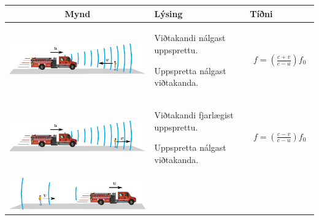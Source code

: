 \ifdefined \wholebook \else\documentclass[oneside]{book}\usepackage{EdlBook}\graphicspath{{figures/}}
\begin{document}
\begin{table}[h!]
  \centering
  \begin{tabular}{ | c | m{5.2cm} | m{2.5cm} | }
    \hline
    \textbf{Mynd} & \hspace{1.9cm} \textbf{Lýsing} & \hspace{0.4cm} \textbf{Tíðni} \\ \hline
    \begin{minipage}{.4\textwidth}
    \vspace{0.3cm}
    \centering
      \includegraphics[width=0.95\linewidth]{figures/doppler-tilvik1.pdf}
    \vspace{0.3cm}
    \end{minipage}
    &
      Viðtakandi nálgast uppsprettu. \par Uppspretta nálgast viðtakanda.
    & 
      \begin{align*}
          f = \left( \frac{c + v}{c - u} \right)f_0
      \end{align*}
    \\ \hline
    \begin{minipage}{.4\textwidth}
    \vspace{0.3cm}
    \centering
      \includegraphics[width=0.95\linewidth]{figures/doppler-tilvik12.pdf}
    \vspace{0.3cm}
    \end{minipage}
    &
          Viðtakandi fjarlægist uppsprettu. \par Uppspretta nálgast viðtakanda.
    & 
      \begin{align*}
          f = \left( \frac{c - v}{c - u} \right)f_0
      \end{align*}
    \\ \hline
    \begin{minipage}{.4\textwidth}
    \vspace{0.3cm}
    \centering
      \includegraphics[width=0.95\linewidth]{figures/doppler-tilvik3.pdf}

\end{minipage}
\end{tabular}
\end{table}
\end{document}

